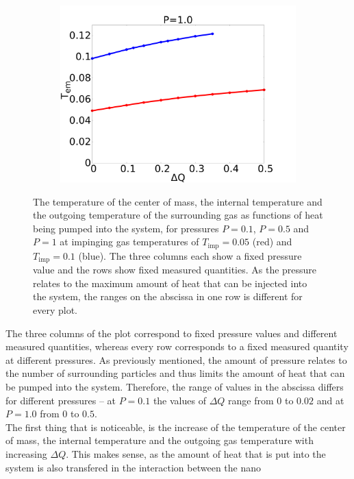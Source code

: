 \documentclass[12pt]{article}
\begin{document}
\begin{figure}[h]
\begin{center}
\begin{subfigure}[t]{0.3\textwidth}
            \includegraphics[scale=0.13]{images/p1_out.pdf}
        \end{subfigure} 
        \caption{The temperature of the center of mass, the internal temperature and the outgoing temperature of the surrounding gas as functions of
            heat being pumped into the system, for pressures
            $P=0.1$, $P=0.5$ and $P=1$ at impinging gas temperatures of $T_\text{imp}=0.05$ (red) and $T_\text{imp}=0.1$ (blue). The three columns each show 
        a fixed pressure value and the rows show fixed measured quantities. As the pressure relates to the maximum amount of heat that can be injected
    into the system, the ranges on the abscissa in one row is different for every plot.}
        \label{fig:comintout}
    \end{center}
\end{figure}
The three columns of the plot correspond to fixed pressure values and different measured quantities, whereas every row corresponds to a fixed measured
quantity at different pressures. As previously mentioned, the amount of pressure relates to the number of surrounding particles and thus limits the
amount of heat that can be pumped into the system. Therefore, the range of values in the abscissa differs for different pressures -- at $P=0.1$ the
values of $\Delta Q$ range from $0$ to $0.02$ and at $P=1.0$ from $0$ to $0.5$.\\
The first thing that is noticeable, is the increase of the temperature of the center of mass, the internal temperature and the outgoing gas temperature
with increasing $\Delta Q$. This makes sense, as the amount of heat that is put into the system is also transfered in the interaction between the nano
\end{document}

